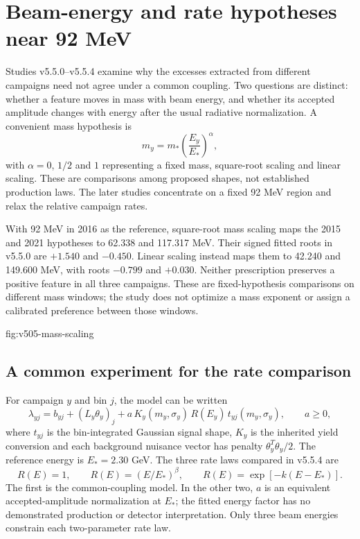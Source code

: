 \section{Beam-energy and rate hypotheses near 92 MeV}
\label{app:v505-energy}
Studies v5.5.0--v5.5.4 examine why the excesses extracted from different
campaigns need not agree under a common coupling. Two questions are distinct:
whether a feature moves in mass with beam energy, and whether its accepted
amplitude changes with energy after the usual radiative normalization.
A convenient mass hypothesis is
\begin{equation}
 m_y=m_*\left(\frac{E_y}{E_*}\right)^\alpha,
\end{equation}
with $\alpha=0$, $1/2$ and $1$ representing a fixed mass, square-root scaling
and linear scaling. These are comparisons among proposed shapes, not
established production laws. The later studies concentrate on a fixed
92 MeV region and relax the relative campaign rates.


With 92 MeV in 2016 as the reference, square-root mass scaling maps the
2015 and 2021 hypotheses to 62.338 and 117.317 MeV. Their signed fitted
roots in v5.5.0 are $+1.540$ and $-0.450$. Linear scaling instead maps them
to 42.240 and 149.600 MeV, with roots $-0.799$ and $+0.030$.
Neither prescription preserves a positive feature in all three campaigns.
These are fixed-hypothesis comparisons on different mass windows; the
study does not optimize a mass exponent or assign a calibrated preference
between those windows.

{fig:v505-mass-scaling}

\subsection{A common experiment for the rate comparison}
For campaign $y$ and bin $j$, the model can be written
\begin{equation}
 \lambda_{yj}=b_{yj}+(L_y\theta_y)_j+
 a\,K_y(m_y,\sigma_y)\,R(E_y)\,t_{yj}(m_y,\sigma_y),
 \qquad a\geq0,
\end{equation}
where $t_{yj}$ is the bin-integrated Gaussian signal shape, $K_y$ is the
inherited yield conversion and each background nuisance vector has penalty
$\theta_y^T\theta_y/2$. The reference energy is $E_*=2.30$ GeV. The three
rate laws compared in v5.5.4 are
\begin{equation}
 R(E)=1,\qquad R(E)=(E/E_*)^\beta,\qquad
 R(E)=\exp[-k(E-E_*)].
 \label{eq:v505-rate-laws}
\end{equation}
The first is the common-coupling model. In the other two, $a$ is an
equivalent accepted-amplitude normalization at $E_*$; the fitted energy
factor has no demonstrated production or detector interpretation.
Only three beam energies constrain each two-parameter rate law.

